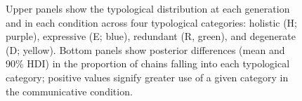 \documentclass[doc,biblatex]{apa7}
\begin{document}
	\begin{figure}
	\vspace*{2pt}
	\caption{Upper panels show the typological distribution at each generation and in each condition across four typological categories: holistic (H; purple), expressive (E; blue), redundant (R, green), and degenerate (D; yellow). Bottom panels show posterior differences (mean and 90\% HDI) in the proportion of chains falling into each typological category; positive values signify greater use of a given category in the communicative condition.}
	\label{typ_dist_dif}
	\end{figure}
\end{document}

